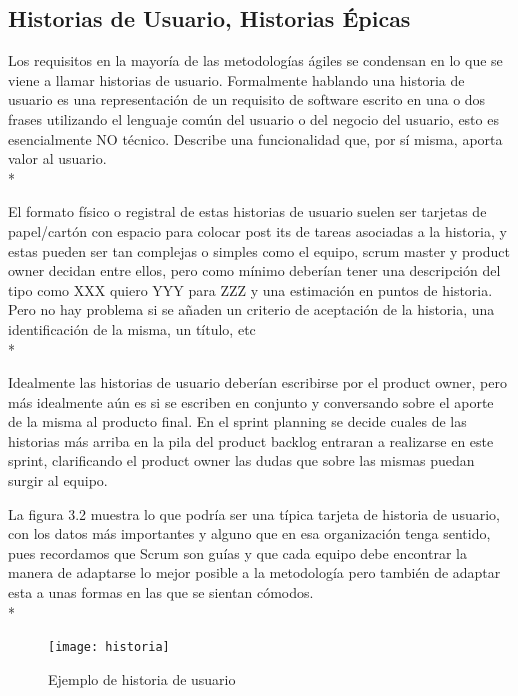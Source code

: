 \documentclass[../pfc.tex]{subfiles}
\begin{document}
	\subsection{Historias de Usuario, Historias Épicas}
	
	Los requisitos en la mayoría de las metodologías ágiles se condensan en lo que se viene a llamar historias de usuario. Formalmente hablando una historia de usuario es una representación de un requisito de software escrito en una o dos frases utilizando el lenguaje común del usuario o del negocio del usuario, esto es esencialmente NO técnico.
	Describe una funcionalidad que, por sí misma, aporta valor al usuario.\\*
	
	El formato físico o registral de estas historias de usuario suelen ser tarjetas de papel/cartón con espacio para colocar post its de tareas asociadas a la historia, y estas pueden ser tan complejas o simples como el equipo, scrum master y product owner decidan entre ellos, pero como mínimo deberían tener una descripción del tipo como XXX quiero YYY para ZZZ y una estimación en puntos de historia. Pero no hay problema si se añaden un criterio de aceptación de la historia, una identificación de la misma, un título, etc\\*
	
	Idealmente las historias de usuario deberían escribirse por el product owner, pero más idealmente aún es si se escriben en conjunto y conversando sobre el aporte de la misma al producto final. En el sprint planning se decide cuales de las historias más arriba en la pila del product backlog entraran a realizarse en este sprint, clarificando el product owner las dudas que sobre las mismas puedan surgir al equipo.
	
	La figura 3.2 muestra lo que podría ser una típica tarjeta de historia de usuario, con los datos más importantes y alguno que en esa organización tenga sentido, pues recordamos que Scrum son guías y que cada equipo debe encontrar la manera de adaptarse lo mejor posible a la metodología pero también de adaptar esta a unas formas en las que se sientan cómodos. \\* 
	
	\begin{figure}[h]
		\centering
		\texttt{[image: historia]}
		\caption{Ejemplo de historia de usuario}
		\label{fig:ejemplo de historia de usuario}
	\end{figure}
	
\end{document}
